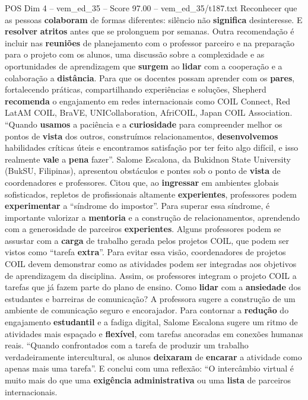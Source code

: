 \begin{textsample}{POS Dim 4 – vem\_ed\_35 – Score 97.00 – vem\_ed\_35/t187.txt}
Reconhecer que as pessoas \textbf{colaboram} de formas diferentes: silêncio não \textbf{significa} desinteresse.
E \textbf{resolver} \textbf{atritos} antes que se prolonguem por semanas.
Outra recomendação é incluir nas \textbf{reuniões} de planejamento com o professor parceiro e na preparação para o projeto com os alunos, uma discussão sobre a complexidade e as oportunidades de aprendizagem que \textbf{surgem} ao \textbf{lidar} com a cooperação e a colaboração a \textbf{distância}.
Para que os docentes possam aprender com os \textbf{pares}, fortalecendo práticas, compartilhando experiências e soluções, Shepherd \textbf{recomenda} o engajamento em redes internacionais como COIL Connect, Red LatAM COIL, BraVE, UNICollaboration, AfriCOIL, Japan COIL Association. “Quando \textbf{usamos} a paciência e a \textbf{curiosidade} para compreender melhor os pontos de \textbf{vista} dos outros, construímos relacionamentos, \textbf{desenvolvemos} habilidades críticas úteis e encontramos satisfação por ter feito algo difícil, e isso realmente \textbf{vale} a \textbf{pena} fazer”.
Salome Escalona, da Bukidnon State University (BukSU, Filipinas), apresentou obstáculos e pontes sob o ponto de \textbf{vista} de coordenadores e professores.
Citou que, ao \textbf{ingressar} em ambientes globais sofisticados, repletos de profissionais altamente \textbf{experientes}, professores podem \textbf{experimentar} a “síndrome do impostor”.
Para superar essa síndrome, é importante valorizar a \textbf{mentoria} e a construção de relacionamentos, aprendendo com a generosidade de parceiros \textbf{experientes}.
Alguns professores podem se assustar com a \textbf{carga} de trabalho gerada pelos projetos COIL, que podem ser vistos como “tarefa \textbf{extra}”.
Para evitar essa visão, coordenadores de projetos COIL devem demonstrar como as atividades podem ser integradas aos objetivos de aprendizagem da disciplina.
Assim, os professores integram o projeto COIL a tarefas que já fazem parte do plano de ensino.
Como \textbf{lidar} com a \textbf{ansiedade} dos estudantes e barreiras de comunicação?
A professora sugere a construção de um ambiente de comunicação seguro e encorajador.
Para contornar a \textbf{redução} do engajamento \textbf{estudantil} e a fadiga digital, Salome Escalona sugere um ritmo de atividades mais espaçado e \textbf{flexível}, com tarefas ancoradas em conexões humanas reais. “Quando confrontados com a tarefa de produzir um trabalho verdadeiramente intercultural, os alunos \textbf{deixaram} de \textbf{encarar} a atividade como apenas mais uma tarefa”.
E conclui com uma reflexão: “O intercâmbio virtual é muito mais do que uma \textbf{exigência} \textbf{administrativa} ou uma \textbf{lista} de parceiros internacionais.

\end{textsample}
